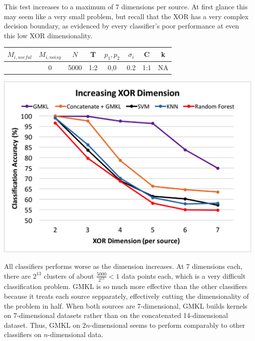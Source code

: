 \documentclass{article}
\begin{document}
This test increases to a maximum of 7 dimensions per source. At first glance
this may seem like a very small problem, but recall that the XOR has a very
complex decision boundary, as evidenced by every classifier's poor performance
at even this low XOR dimensionality.

\begin{minipage}{\textwidth}
\centering
\begin{tabular}{|c|c|c|c|c|c|c|c|}
\hline
$M_{i,useful}$ & $M_{i, noisy}$ & $N$ & T &  $p_1, p_2$ & $\sigma_i$ & C &  k  \\
\hline
[2,3,4,5,6,7] & 0 & 5000 & 1:2 & 0,0 & 0.2 & 1:1 & NA  \\
\hline
\end{tabular}
\label{tab:exp_1_params}
\end{minipage}



\begin{minipage}{\textwidth}
\centering
\includegraphics[scale=0.4]{experimentpic1.png}
\label{fig:exp_1}
\end{minipage}


All classifiers performs worse as the dimension increases. At 7 dimensions
each, there are $2^{13}$ clusters of about $\frac{5000}{2^{13}} < 1$ data
points each, which is a very difficult classification problem. GMKL is so much
more effective than the other classifiers because it treats each source
sepparately, effectively cutting the dimensionality of the problem in half.
When both sources are 7-dimensional, GMKL builds kernels on 7-dimensional
datasets rather than on the concatenated 14-dimensional dataset. Thus, GMKL on
$2n$-dimensional seems to perform comparably to other classifiers on
$n$-dimensional data.
\end{document}
